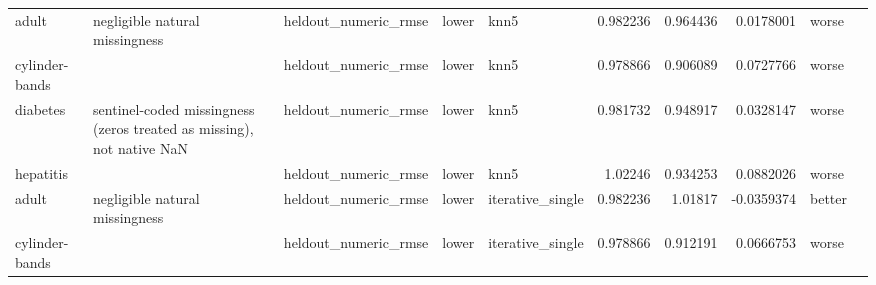 \begin{table}[ht]
{\begin{tabular}{lllllrrrll}
 adult          & negligible natural missingness                                        & heldout\_numeric\_rmse           & lower              & knn5             &                   0.982236 &               0.964436 &                     0.0178001   & worse                &                                                                                                                    \\
 cylinder-bands &                                                                       & heldout\_numeric\_rmse           & lower              & knn5             &                   0.978866 &               0.906089 &                     0.0727766   & worse                &                                                                                                                    \\
 diabetes       & sentinel-coded missingness (zeros treated as missing), not native NaN & heldout\_numeric\_rmse           & lower              & knn5             &                   0.981732 &               0.948917 &                     0.0328147   & worse                &                                                                                                                    \\
 hepatitis      &                                                                       & heldout\_numeric\_rmse           & lower              & knn5             &                   1.02246  &               0.934253 &                     0.0882026   & worse                &                                                                                                                    \\
 adult          & negligible natural missingness                                        & heldout\_numeric\_rmse           & lower              & iterative\_single &                   0.982236 &               1.01817  &                    -0.0359374   & better               &                                                                                                                    \\
 cylinder-bands &                                                                       & heldout\_numeric\_rmse           & lower              & iterative\_single &                   0.978866 &               0.912191 &                     0.0666753   & worse                &                                                                                                                    \\

\end{tabular}}
\end{table}
